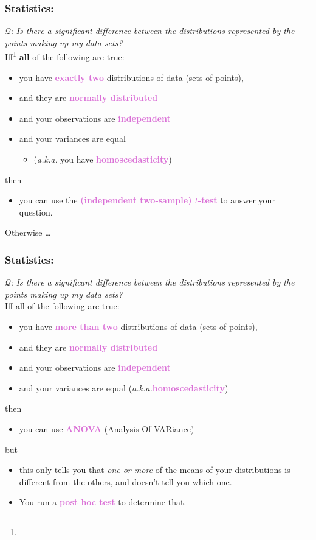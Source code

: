 \documentclass{beamer}
\newcommand{\aka}{\textit{a.k.a.}\xspace}
\newcommand{\key}[1]{\textcolor{orchid}{{\bf #1}}}
\newcommand{\kq}[1]{\textcolor{burntumber}{$\mathcal{Q}$: \emph{#1}}}
\begin{document}
\begin{frame}
\frametitle{Statistics: }
\kq{Is there a significant difference between the distributions represented by the points making up my data sets?}\\
\vspace{0.5em}
Iff\footnote{} {\bf all} of the following are true:
\begin{itemize}\pause\pause
\item you have \key{exactly two} distributions of data (sets of points), \pause
\item and they are \key{normally distributed} \pause
\item and your observations are \key{independent} \pause
\item and your variances are equal
	\begin{itemize}
	\item[] (\aka you have \key{homoscedasticity})
	\end{itemize}
\end{itemize}
then \pause
\begin{itemize}
\item you can use the \key{(independent two-sample) $t$-test}
to answer your question.
\end{itemize}
\pause
Otherwise \dots
\end{frame}

\begin{frame}
\frametitle{Statistics: }
\kq{Is there a significant difference between the distributions represented by the points making up my data sets?}\\
\vspace{0.5em}
Iff all of the following are true:
\begin{itemize}
\item you have \key{\underline{\bf more than} {\bf two}} distributions of data (sets of points),
\item and they are \key{normally distributed} 
\item and your observations are \key{independent}
\item and your variances are equal (\aka \key{homoscedasticity}) 
\end{itemize}
then \pause
\begin{itemize}
\item you can use \key{ANOVA} (Analysis Of VARiance)
\end{itemize}
but \pause
\begin{itemize}
\item this only tells you that \emph{one or more} of the means of
	your distributions is different from the others, and doesn't tell
	you which one.
\item \pause You run a \key{post hoc test} to determine that.
\end{itemize}
\end{frame}
\end{document}
